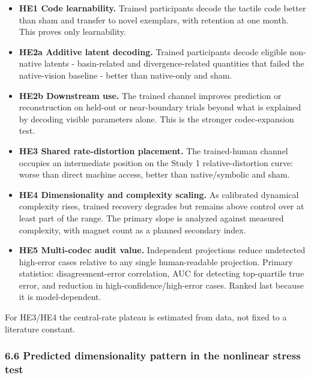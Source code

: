 \documentclass[
  11pt,
]{article}
\providecommand{\tightlist}{%
  \setlength{\itemsep}{0pt}\setlength{\parskip}{0pt}}
\begin{document}
\begin{itemize}
\tightlist
\item
  \textbf{HE1 Code learnability.} Trained
  participants decode the tactile code better
  than sham and transfer to novel exemplars,
  with retention at one month. This proves only
  learnability.
\item
  \textbf{HE2a Additive latent decoding.}
  Trained participants decode eligible
  non-native latents - basin-related and
  divergence-related quantities that failed the
  native-vision baseline - better than
  native-only and sham.
\item
  \textbf{HE2b Downstream use.} The trained
  channel improves prediction or reconstruction
  on held-out or near-boundary trials beyond
  what is explained by decoding visible
  parameters alone. This is the stronger
  codec-expansion test.
\item
  \textbf{HE3 Shared rate-distortion placement.}
  The trained-human channel occupies an
  intermediate position on the Study 1
  relative-distortion curve: worse than direct
  machine access, better than native/symbolic
  and sham.
\item
  \textbf{HE4 Dimensionality and complexity
  scaling.} As calibrated dynamical complexity
  rises, trained recovery degrades but remains
  above control over at least part of the range.
  The primary slope is analyzed against measured
  complexity, with magnet count as a planned
  secondary index.
\item
  \textbf{HE5 Multi-codec audit value.}
  Independent projections reduce undetected
  high-error cases relative to any single
  human-readable projection. Primary statistics:
  disagreement-error correlation, AUC for
  detecting top-quartile true error, and
  reduction in high-confidence/high-error cases.
  Ranked last because it is model-dependent.
\end{itemize}

For HE3/HE4 the central-rate plateau is
estimated from data, not fixed to a literature
constant.

\subsubsection{6.6 Predicted dimensionality
pattern in the nonlinear stress
test}\label{predicted-dimensionality-pattern-in-the-nonlinear-stress-test}
\end{document}

